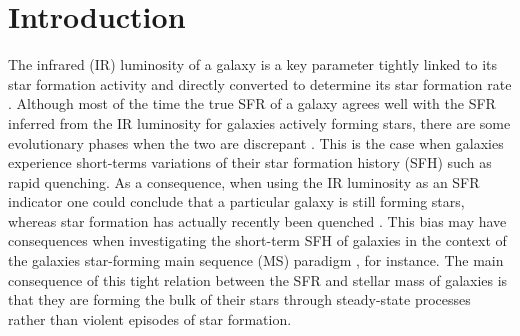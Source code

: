 \documentclass[traditabstract]{aa} %
\begin{document}


   \maketitle

\section{\label{intro}Introduction}

The infrared (IR) luminosity of a galaxy is a key parameter tightly linked to its star formation activity and directly converted to determine its star formation rate \citep[SFR, e.g.,][]{KennicuttEvans12}.
Although most of the time the true SFR of a galaxy agrees well with the SFR inferred from the IR luminosity for galaxies actively forming stars, there are some evolutionary phases when the two are discrepant \citep{Hayward14,Boquien14}.
This is the case when galaxies experience short-terms variations of their star formation history (SFH) such as rapid quenching.
As a consequence, when using the IR luminosity as an SFR indicator one could conclude that a particular galaxy is still forming stars, whereas star formation has actually recently been quenched \citep{Hayward14}.
This bias may have consequences when investigating the short-term SFH of galaxies in the context of the galaxies star-forming main sequence (MS) paradigm \citep{Elbaz07,Noeske07}, for instance.
The main consequence of this tight relation between the SFR and stellar mass of galaxies is that they are forming the bulk of their stars through steady-state processes rather than violent episodes of star formation.
\end{document}
